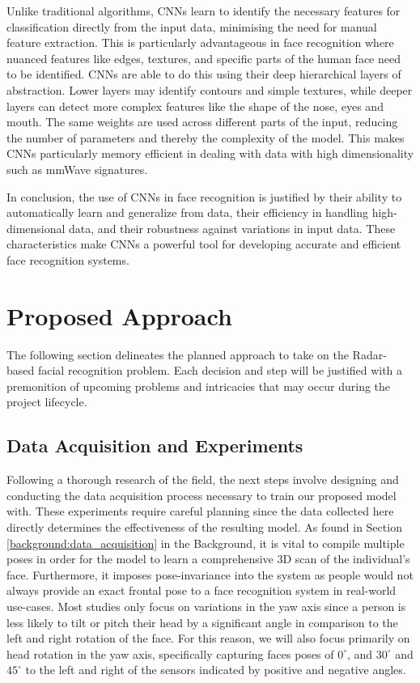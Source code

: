 \documentclass{interim}
\begin{document}
Unlike traditional algorithms, CNNs learn to identify the necessary features for classification directly from the input data, minimising the need for manual feature extraction. This is particularly advantageous in face recognition where nuanced features like edges, textures, and specific parts of the human face need to be identified. CNNs are able to do this using their deep hierarchical layers of abstraction. Lower layers may identify contours and simple textures, while deeper layers can detect more complex features like the shape of the nose, eyes and mouth. The same weights are used across different parts of the input, reducing the number of parameters and thereby the complexity of the model. This makes CNNs particularly memory efficient in dealing with data with high dimensionality such as mmWave signatures.

In conclusion, the use of CNNs in face recognition is justified by their ability to automatically learn and generalize from data, their efficiency in handling high-dimensional data, and their robustness against variations in input data. These characteristics make CNNs a powerful tool for developing accurate and efficient face recognition systems.


\newpage
\section{Proposed Approach}
The following section delineates the planned approach to take on the Radar-based facial recognition problem. Each decision and step will be justified with a premonition of upcoming problems and intricacies that may occur during the project lifecycle.

\subsection{Data Acquisition and Experiments}
\label{approach:data_acquisition}
Following a thorough research of the field, the next steps involve designing and conducting the data acquisition process necessary to train our proposed model with. These experiments require careful planning since the data collected here directly determines the effectiveness of the resulting model. As found in Section \ref{background:data_acquisition} in the Background, it is vital to compile multiple poses in order for the model to learn a comprehensive 3D scan of the individual's face. Furthermore, it imposes pose-invariance into the system as people would not always provide an exact frontal pose to a face recognition system in real-world use-cases. Most studies only focus on variations in the yaw axis since a person is less likely to tilt or pitch their head by a significant angle in comparison to the left and right rotation of the face. For this reason, we will also focus primarily on head rotation in the yaw axis, specifically capturing faces poses of $0^\circ$, and $30^\circ$ and $45^\circ$ to the left and right of the sensors indicated by positive and negative angles. 
\end{document}
